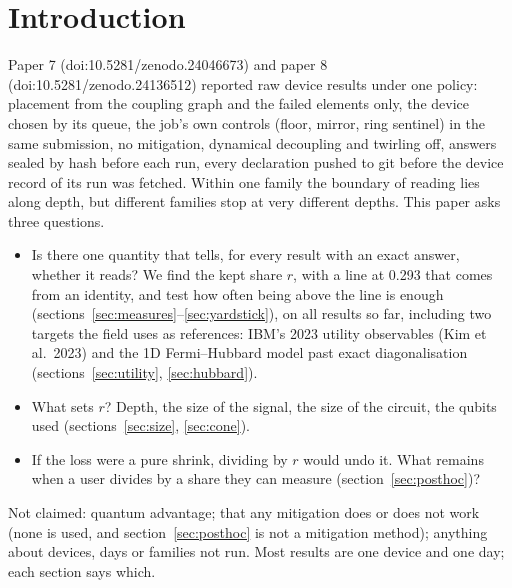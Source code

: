\documentclass[10pt,a4paper]{article}
\begin{document}
\section{Introduction}\label{sec:intro}
Paper 7 (doi:10.5281/zenodo.24046673) and paper 8 (doi:10.5281/zenodo.24136512) reported raw device results under
one policy: placement from the coupling graph and the failed elements only, the device chosen by its queue, the job's
own controls (floor, mirror, ring sentinel) in the same submission, no mitigation, dynamical decoupling and twirling
off, answers sealed by hash before each run, every declaration pushed to git before the device record of its run was
fetched. Within one family the boundary of reading lies along depth, but different families stop at very different
depths. This paper asks three questions.
\begin{itemize}
\item Is there one quantity that tells, for every result with an exact answer, whether it reads? We find the kept
share $r$, with a line at 0.293 that comes from an identity, and test how often being above the line is enough
(sections~\ref{sec:measures}--\ref{sec:yardstick}), on all results so far, including two targets the field uses as
references: IBM's 2023 utility observables (Kim et al.\ 2023) and the 1D Fermi--Hubbard model past exact
diagonalisation (sections~\ref{sec:utility}, \ref{sec:hubbard}).
\item What sets $r$? Depth, the size of the signal, the size of the circuit, the qubits used
(sections~\ref{sec:size}, \ref{sec:cone}).
\item If the loss were a pure shrink, dividing by $r$ would undo it. What remains when a user divides by a share they
can measure (section~\ref{sec:posthoc})?
\end{itemize}
Not claimed: quantum advantage; that any mitigation does or does not work (none is used, and section~\ref{sec:posthoc}
is not a mitigation method); anything about devices, days or families not run. Most results are one device and one
day; each section says which.
\end{document}
